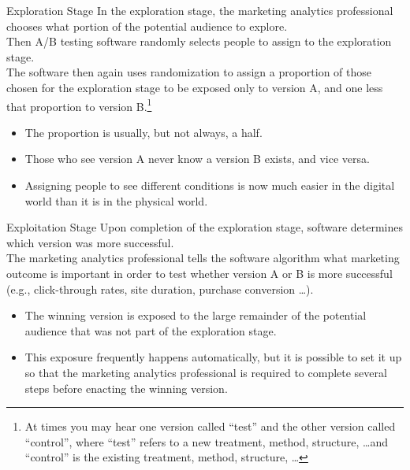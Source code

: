 \documentclass[pdf]{beamer}
\theoremstyle{remark}
\theoremstyle{definition}
\begin{document}
\begin{frame}[t]{Exploration Stage}
In the exploration stage, the marketing analytics professional chooses what portion of the potential audience to explore. \\
\vspace{1.5ex} 
Then A/B testing software randomly selects people to assign to the exploration stage. \\
\vspace{1.5ex}
The software then again uses randomization to assign a proportion of those chosen for the exploration stage to be exposed only to version A, and one less that proportion to version B.\footnote{At times you may hear one version called ``test'' and the other version called ``control'', where ``test'' refers to a new treatment, method, structure, \ldots and ``control'' is the existing treatment, method, structure, \ldots }  \\
\vspace{0.5ex}
\small
\begin{itemize}
\item The proportion is usually, but not always, a half.  
\item Those who see version A never know a version B exists, and vice versa.
\item Assigning people to see different conditions is now much easier in the digital world than it is in the physical world.
\end{itemize}
\end{frame}

\begin{frame}[t]{Exploitation Stage}
Upon completion of the exploration stage, software determines which version was more successful. \\
\vspace{1.5ex} 
The marketing analytics professional tells the software algorithm what marketing outcome is important in order to test whether version A or B is more successful (e.g., click-through rates, site duration, purchase conversion \ldots ). \\
\vspace{1.5ex}
\begin{itemize}
\item The winning version is exposed to the large remainder of the potential audience that was not part of the exploration stage. 
\item This exposure frequently happens automatically, but it is possible to set it up so that the marketing analytics professional is required to complete several steps before enacting the winning version.
\end{itemize}
\end{frame}
\end{document}
